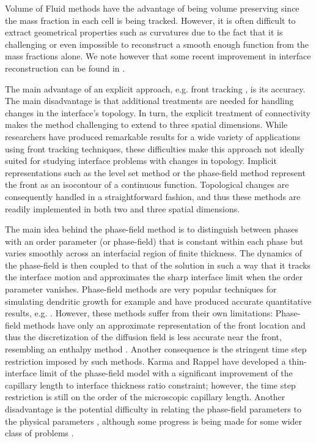 \documentclass[english]{article}
\begin{document}
Volume of Fluid methods
\cite{benson:1992:hydrocodes,benson:2002:VOF_Review,DeBar:1974:KRAKEN,Hirt_Nichols:1981:VOF,Noh_Woodward:1976:SLIC,Youngs:1984:VOF}
have the advantage of being volume preserving since the mass fraction in
each cell is being tracked. However, it is often difficult to extract
geometrical properties such as curvatures due to the fact that it is
challenging or even impossible to reconstruct a smooth enough function from
the mass fractions alone. We note however that some recent improvement in
interface reconstruction can be found in \cite{Dyadechko:2006:MOF}.

The main advantage of an explicit approach, e.g. front tracking
\cite{glimm:1999:fronttracking, Juric:1996:Dendritic_Solidification,
Juric:1998:Boiling_Flows, Tryggvason:2001:Front_Tracking_Flows_Review}, is
its accuracy. The main disadvantage is that additional treatments are
needed for handling changes in the interface's topology. In turn, the
explicit treatment of connectivity makes the method challenging to extend
to three spatial dimensions. While researchers have produced remarkable
results for a wide variety of applications using front tracking techniques,
these difficulties make this approach not ideally suited for studying
interface problems with changes in topology. Implicit representations such
as the level set method or the phase-field method represent the front as an
isocontour of a continuous function. Topological changes are consequently
handled in a straightforward fashion, and thus these methods are readily
implemented in both two and three spatial dimensions.

The main idea behind the phase-field method is to distinguish between
phases with an order parameter (or phase-field) that is constant within
each phase but varies smoothly across an interfacial region of finite
thickness. The dynamics of the phase-field is then coupled to that of the
solution in such a way that it tracks the interface motion and approximates
the sharp interface limit when the order parameter vanishes. Phase-field
methods are very popular techniques for simulating dendritic growth for
example and have produced accurate quantitative results, e.g.
\cite{Langer:1986:Phase_Field, Karma_Rappel:1997:Phase_Field_2D_3D,
Karma:2001:Phase_Field_Different_Diffusion,
Nestler:2005:Phase_Field_FEM_FDM, Schmidt:1996:CTD}. However, these methods
suffer from their own limitations: Phase-field methods have only an
approximate representation of the front location and thus the
discretization of the diffusion field is less accurate near the front,
resembling an enthalpy method \cite{chorin:1967:ANM}. Another consequence
is the stringent time step restriction imposed by such methods. Karma and
Rappel \cite{Karma_Rappel:1996:Phase_Field_Kinetics} have developed a
thin-interface limit of the phase-field model with a significant
improvement of the capillary length to interface thickness ratio
constraint; however, the time step restriction is still on the order of the
microscopic capillary length. Another disadvantage is the potential
difficulty in relating the phase-field parameters to the physical
parameters \cite{Wheeler:1993:Handbook}, although some progress is being
made for some wider class of problems
\cite{Elder_Provatas:2001:Phase_Field_Sharp_Interface}.
\end{document}
